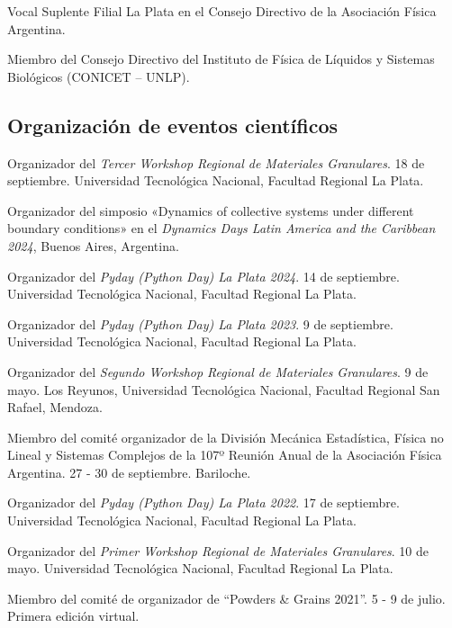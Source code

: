  Vocal Suplente Filial La Plata en el Consejo Directivo de la Asociación Física Argentina.

 Miembro del Consejo Directivo del Instituto de Física de Líquidos y Sistemas Biológicos (CONICET -- UNLP).



\subsection{Organización de eventos científicos}

 Organizador del \textit{Tercer Workshop Regional de Materiales Granulares}. 18 de septiembre. Universidad Tecnológica Nacional, Facultad Regional La Plata.

 Organizador del simposio «Dynamics of collective systems under different boundary conditions» en el \textit{Dynamics Days Latin America and the Caribbean 2024}, Buenos Aires, Argentina.

 Organizador del \textit{Pyday (Python Day) La Plata 2024}. 14 de septiembre. Universidad Tecnológica Nacional, Facultad Regional La Plata.

 Organizador del \textit{Pyday (Python Day) La Plata 2023}. 9 de septiembre. Universidad Tecnológica Nacional, Facultad Regional La Plata.

 Organizador del \textit{Segundo Workshop Regional de Materiales Granulares}. 9 de mayo. Los Reyunos, Universidad Tecnológica Nacional, Facultad Regional San Rafael, Mendoza.

 Miembro del comité organizador de la División Mecánica Estadística, Física no Lineal y Sistemas Complejos de la 107º Reunión Anual de la Asociación Física Argentina. 27 - 30 de septiembre. Bariloche.

 Organizador del \textit{Pyday (Python Day) La Plata 2022}. 17 de septiembre. Universidad Tecnológica Nacional, Facultad Regional La Plata.

 Organizador del \textit{Primer Workshop Regional de Materiales Granulares}. 10 de mayo. Universidad Tecnológica Nacional, Facultad Regional La Plata.

 Miembro del comité de organizador de ``Powders \& Grains 2021''. 5 - 9 de julio. Primera edición virtual.


